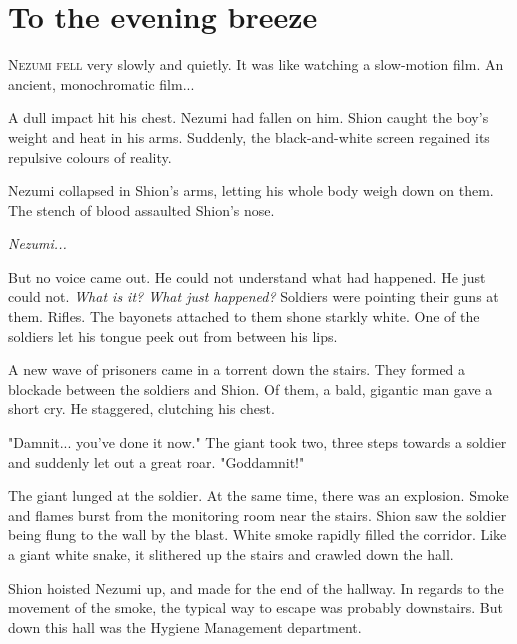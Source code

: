 
\chapter{To the evening breeze}


\lettrine{N}{ezumi fell} very slowly and quietly. It was like watching a slow-motion
film. An ancient, monochromatic film...

A dull impact hit his chest. Nezumi had fallen on him. Shion caught the
boy's weight and heat in his arms. Suddenly, the black-and-white screen
regained its repulsive colours of reality.

Nezumi collapsed in Shion's arms, letting his whole body weigh down on
them. The stench of blood assaulted Shion's nose.

\emph{Nezumi...}

But no voice came out. He could not understand what had happened. He
just could not. \emph{What is it? What just happened?} Soldiers were pointing
their guns at them. Rifles. The bayonets attached to them shone starkly
white. One of the soldiers let his tongue peek out from between his
lips.

A new wave of prisoners came in a torrent down the stairs. They formed a
blockade between the soldiers and Shion. Of them, a bald, gigantic man
gave a short cry. He staggered, clutching his chest.

"Damnit... you've done it now." The giant took two, three steps towards
a soldier and suddenly let out a great roar. "Goddamnit!"

The giant lunged at the soldier. At the same time, there was an
explosion. Smoke and flames burst from the monitoring room near the
stairs. Shion saw the soldier being flung to the wall by the blast.
White smoke rapidly filled the corridor. Like a giant white snake, it
slithered up the stairs and crawled down the hall.

Shion hoisted Nezumi up, and made for the end of the hallway. In regards
to the movement of the smoke, the typical way to escape was probably
downstairs. But down this hall was the Hygiene Management department.

